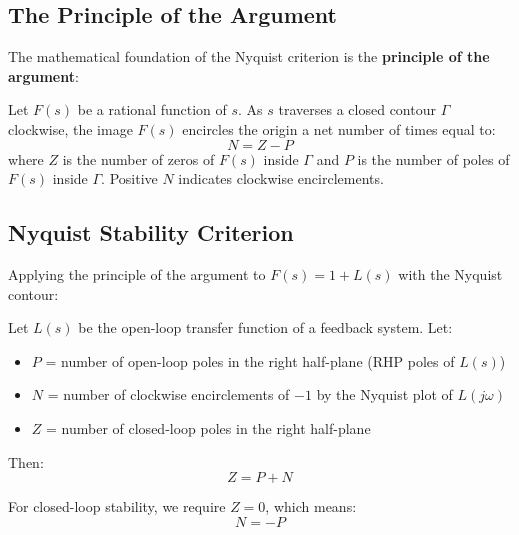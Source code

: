 \subsection{The Principle of the Argument}

The mathematical foundation of the Nyquist criterion is the \textbf{principle of the argument}:

\begin{theorem}
Let $F(s)$ be a rational function of $s$. As $s$ traverses a closed contour $\Gamma$ clockwise, the image $F(s)$ encircles the origin a net number of times equal to:
\begin{equation}
N = Z - P
\end{equation}
where $Z$ is the number of zeros of $F(s)$ inside $\Gamma$ and $P$ is the number of poles of $F(s)$ inside $\Gamma$. Positive $N$ indicates clockwise encirclements.
\end{theorem}

\subsection{Nyquist Stability Criterion}

Applying the principle of the argument to $F(s) = 1 + L(s)$ with the Nyquist contour:

\begin{theorem}
\label{thm:nyquist}
Let $L(s)$ be the open-loop transfer function of a feedback system. Let:
\begin{itemize}
    \item $P$ = number of open-loop poles in the right half-plane (RHP poles of $L(s)$)
    \item $N$ = number of clockwise encirclements of $-1$ by the Nyquist plot of $L(j\omega)$
    \item $Z$ = number of closed-loop poles in the right half-plane
\end{itemize}

Then:
\begin{equation}
Z = P + N
\label{eq:nyquist_formula}
\end{equation}

For closed-loop stability, we require $Z = 0$, which means:
\begin{equation}
N = -P
\end{equation}
\end{theorem}


